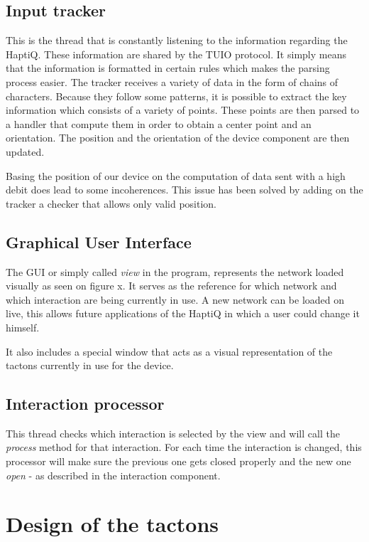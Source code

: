 \subsection{Input tracker}\label{input-tracker}

This is the thread that is constantly listening to the information
regarding the HaptiQ. These information are shared by the TUIO protocol.
It simply means that the information is formatted in certain rules which
makes the parsing process easier. The tracker receives a variety of data
in the form of chains of characters. Because they follow some patterns,
it is possible to extract the key information which consists of a
variety of points. These points are then parsed to a handler that
compute them in order to obtain a center point and an orientation. The
position and the orientation of the device component are then updated.

Basing the position of our device on the computation of data sent with a
high debit does lead to some incoherences. This issue has been solved by
adding on the tracker a checker that allows only valid position.

\subsection{Graphical User Interface}\label{graphical-user-interface}

The GUI or simply called \emph{view} in the program, represents the
network loaded visually as seen on figure x. It serves as the reference
for which network and which interaction are being currently in use. A
new network can be loaded on live, this allows future applications of
the HaptiQ in which a user could change it himself.

It also includes a special window that acts as a visual representation
of the tactons currently in use for the device. 


\subsection{Interaction processor}\label{interaction-processor}

This thread checks which interaction is selected by the view and will
call the \emph{process} method for that interaction. For each time the
interaction is changed, this processor will make sure the previous one
gets closed properly and the new one \emph{open} - as described in the
interaction component.

\section{Design of the tactons}\label{design-of-the-tactons}

